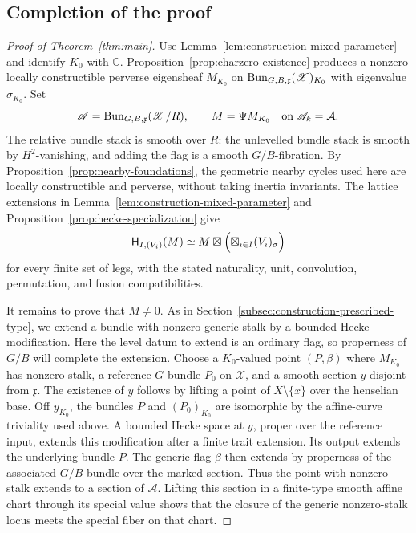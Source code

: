 \subsection{Completion of the proof}

\begin{proof}[Proof of Theorem~\ref{thm:main}]\label{proof:main}
Use Lemma~\ref{lem:construction-mixed-parameter} and identify $K_0$
with $\mathbb C$.  Proposition~\ref{prop:charzero-existence} produces
a nonzero locally constructible perverse eigensheaf $M_{K_0}$ on
$\operatorname{Bun}_{G,B,\mathfrak x}(\mathscr X)_{K_0}$ with eigenvalue
$\sigma_{K_0}$.  Set
\[
 \mathscr A=\operatorname{Bun}_{G,B,\mathfrak x}(\mathscr X/R),
 \qquad M=\Psi M_{K_0}\quad\text{on }\mathscr A_k=\mathcal A.
\]
The relative bundle stack is smooth over $R$: the unlevelled bundle
stack is smooth by $H^2$-vanishing, and adding the flag is a smooth
$G/B$-fibration.  By Proposition~\ref{prop:nearby-foundations}, the
geometric nearby cycles used here are locally constructible and
perverse, without taking inertia invariants.  The lattice extensions
in Lemma~\ref{lem:construction-mixed-parameter} and
Proposition~\ref{prop:hecke-specialization} give
\[
 \mathsf H_{I,(V_i)}(M)
 \simeq M\boxtimes\Bigl(\boxtimes_{i\in I}(V_i)_\sigma\Bigr)
\]
for every finite set of legs, with the stated naturality, unit,
convolution, permutation, and fusion compatibilities.

It remains to prove that $M\ne0$.  As in
Section~\ref{subsec:construction-prescribed-type}, we extend a bundle
with nonzero generic stalk by a bounded Hecke modification.  Here the
level datum to extend is an ordinary flag, so properness of $G/B$
will complete the extension.  Choose a $K_0$-valued point $(P,\beta)$
where $M_{K_0}$ has nonzero stalk,
a reference $G$-bundle $P_0$ on $\mathscr X$, and a smooth section
$y$ disjoint from $\mathfrak x$.  The existence of $y$ follows by
lifting a point of $X\setminus\{x\}$ over the henselian base.
Off $y_{K_0}$, the bundles $P$ and $(P_0)_{K_0}$ are isomorphic by
the affine-curve triviality used above.  A bounded Hecke space at
$y$, proper over the reference input, extends this modification
after a finite trait extension.  Its output extends the underlying
bundle $P$.  The generic flag $\beta$ then extends by properness of
the associated $G/B$-bundle over the marked section.  Thus the
point with nonzero stalk extends to a section of $\mathscr A$.
Lifting this section in a finite-type smooth affine chart through
its special value shows that the closure of the generic
nonzero-stalk locus meets the special fiber on that chart.


\end{proof}
